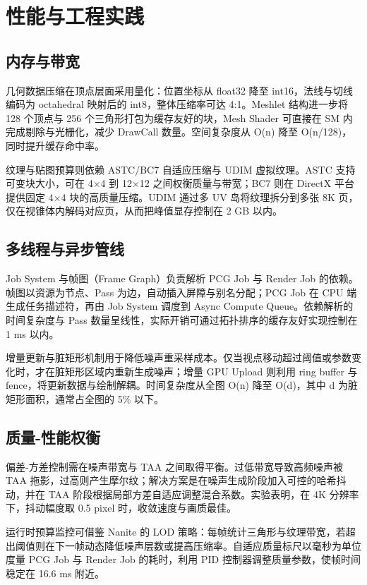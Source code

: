 \chapter{性能与工程实践}
\section{内存与带宽}
几何数据压缩在顶点层面采用量化：位置坐标从 float32 降至 int16，法线与切线编码为 octahedral 映射后的 int8，整体压缩率可达 4:1。Meshlet 结构进一步将 128 个顶点与 256 个三角形打包为缓存友好的块，Mesh Shader 可直接在 SM 内完成剔除与光栅化，减少 DrawCall 数量。空间复杂度从 O(n) 降至 O(n/128)，同时提升缓存命中率。\par
纹理与贴图预算则依赖 ASTC/BC7 自适应压缩与 UDIM 虚拟纹理。ASTC 支持可变块大小，可在 4×4 到 12×12 之间权衡质量与带宽；BC7 则在 DirectX 平台提供固定 4×4 块的高质量压缩。UDIM 通过多 UV 岛将纹理拆分到多张 8K 页，仅在视锥体内解码对应页，从而把峰值显存控制在 2 GB 以内。\par
\section{多线程与异步管线}
Job System 与帧图（Frame Graph）负责解析 PCG Job 与 Render Job 的依赖。帧图以资源为节点、Pass 为边，自动插入屏障与别名分配；PCG Job 在 CPU 端生成任务描述符，再由 Job System 调度到 Async Compute Queue。依赖解析的时间复杂度与 Pass 数量呈线性，实际开销可通过拓扑排序的缓存友好实现控制在 1 ms 以内。\par
增量更新与脏矩形机制用于降低噪声重采样成本。仅当视点移动超过阈值或参数变化时，才在脏矩形区域内重新生成噪声；增量 GPU Upload 则利用 ring buffer 与 fence，将更新数据与绘制解耦。时间复杂度从全图 O(n) 降至 O(d)，其中 d 为脏矩形面积，通常占全图的 5\%{} 以下。\par
\section{质量-性能权衡}
偏差-方差控制需在噪声带宽与 TAA 之间取得平衡。过低带宽导致高频噪声被 TAA 拖影，过高则产生摩尔纹；解决方案是在噪声生成阶段加入可控的哈希抖动，并在 TAA 阶段根据局部方差自适应调整混合系数。实验表明，在 4K 分辨率下，抖动幅度取 0.5 pixel 时，收敛速度与画质最佳。\par
运行时预算监控可借鉴 Nanite 的 LOD 策略：每帧统计三角形与纹理带宽，若超出阈值则在下一帧动态降低噪声层数或提高压缩率。自适应质量标尺以毫秒为单位度量 PCG Job 与 Render Job 的耗时，利用 PID 控制器调整质量参数，使帧时间稳定在 16.6 ms 附近。\par
